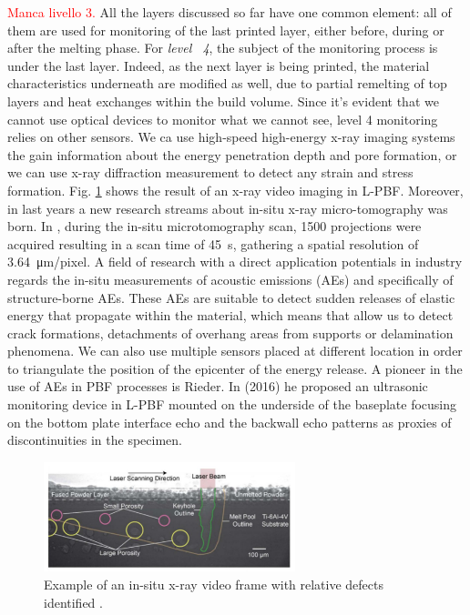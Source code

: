 \textcolor{red}{Manca livello 3.}
All the layers discussed so far have one common element: all of them are used for monitoring of the last printed layer, either before, during or after the melting phase. For \emph{level ~4}, the subject of the monitoring process is under the last layer. Indeed, as the next layer is being printed, the material characteristics underneath are modified as well, due to partial remelting of top layers and heat exchanges within the build volume. Since it's evident that we cannot use optical devices to monitor what we cannot see, level 4 monitoring relies on other sensors. We ca use high-speed high-energy x-ray imaging systems the gain information about the energy penetration depth and pore formation, or we can use x-ray diffraction measurement to detect any strain and stress formation. Fig. \ref{fig:xray4} shows the result of an x-ray video imaging in L-PBF. Moreover, in last years a new research streams about in-situ x-ray micro-tomography was born. In \citeauthor{lhuissier_situ_2020}, during the in-situ microtomography scan, 1500 projections were acquired resulting in a scan time of \SI{45}{s}, gathering a spatial resolution of \SI{3.64}{\micro\metre / pixel}. A field of research with a direct application potentials in industry regards the in-situ measurements of acoustic emissions (AEs) and specifically of structure-borne AEs. These AEs  are suitable to detect sudden releases of elastic energy that propagate within the material, which means that allow us to detect crack formations, detachments of overhang areas from supports or delamination phenomena. We can also use multiple sensors placed at different location in order to triangulate the position of the epicenter of the energy release. A pioneer in the use of AEs in PBF processes is Rieder. In \citeauthor{rieder_-_2016} (2016) he proposed an ultrasonic monitoring device in L-PBF mounted on the underside of the baseplate focusing on the bottom plate interface echo and the backwall echo patterns as proxies of discontinuities in the specimen.
\begin{figure}
    \centering
    \includegraphics[width=0.65\textwidth]{Images/xray4.png}
    \caption[X-ray video frame.]{Example of an in-situ x-ray video frame with relative defects identified \cite{paulson_correlations_2020}.}
    \label{fig:xray4}
\end{figure}
